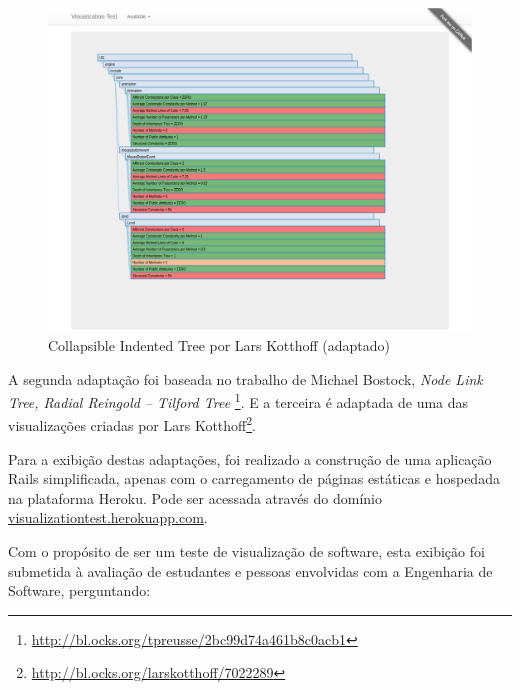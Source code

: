 \begin{figure}[!htb]
	\centering
    \includegraphics[keepaspectratio=true,scale=0.35]
    {figuras/node_link_tree_with_interaction.eps}
  \caption{Collapsible Indented Tree por Lars Kotthoff (adaptado)}
  \label{fig:node_link_tree_with_interaction}
\end{figure}

A segunda adaptação foi baseada no trabalho de Michael Bostock, \textit{Node
Link Tree, Radial Reingold – Tilford Tree}
\footnote{\url{http://bl.ocks.org/tpreusse/2bc99d74a461b8c0acb1}}. E a terceira
é adaptada de uma das visualizações criadas por Lars
Kotthoff\footnote{\url{http://bl.ocks.org/larskotthoff/7022289}}.

Para a exibição destas adaptações, foi realizado a construção de uma aplicação
Rails simplificada, apenas com o carregamento de páginas estáticas e hospedada
na plataforma Heroku. Pode ser acessada através do domínio
\href{https://visualizationtest.herokuapp.com/}{visualizationtest.herokuapp.com}.


Com o propósito de ser um teste de visualização de software, esta exibição foi
submetida à avaliação de estudantes e pessoas envolvidas com a Engenharia de
Software, perguntando:

